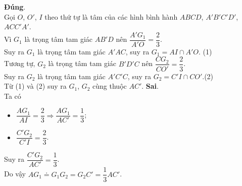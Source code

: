 \begin{ex}
{\begin{itemchoice}
			\itemch \textbf{Đúng}.\\ 
			Gọi $O$, $O'$, $I$ theo thứ tự là tâm của các hình  bình hành $ABCD$, $A'B'C'D'$, $ACC'A'$.\\
			Vì  $G_1$ là trọng tâm tam giác $AB'D$ nên $\dfrac{A'G_1}{A'O}=\dfrac{2}{3}$.\\
			Suy ra $G_1$ là trọng tâm tam giác $A'AC$, suy  ra $G_1=AI\cap A'O$. \hfill(1)\\
			Tương tự, $G_2$ là trọng  tâm tam giác $B'D'C$ nên $\dfrac{CG_2}{CO'}=\dfrac{2}{3}$.\\
			Suy ra $G_2$ là trọng  tâm tam giác $A'C'C$, suy ra $G_2=C'I\cap CO'$.\hfill(2)\\
			Từ (1) và  (2) suy ra $G_1$, $G_2$ cùng thuộc $AC'$.
			 \itemch \textbf{Sai}.\\
			Ta có 
			\begin{itemize}
				\item $\dfrac{AG_1}{AI}=\dfrac{2}{3}  \Rightarrow \dfrac{AG_1}{AC'}=\dfrac{1}{3}$;
				 \item $\dfrac{C'G_2}{C'I}=\dfrac{2}{3}$.
			\end{itemize}
			Suy  ra $\dfrac{C'G_2}{AC'}=\dfrac{1}{3}$.\\
			 Do vậy $AG_1\doteq G_1 G_2=G_2 C'=\dfrac{1}{3}AC'$.
		\end{itemchoice}
	 }
\end{ex}

